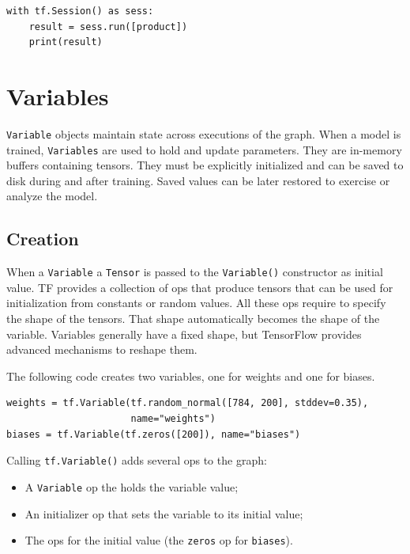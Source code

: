\begin{lstlisting}
with tf.Session() as sess:
    result = sess.run([product])
    print(result)
\end{lstlisting}

\section{Variables}

\lstinline|Variable| objects maintain state across executions of the graph. When a model is trained, \lstinline|Variables| are used to hold and update parameters. They are in-memory buffers containing tensors. They must be explicitly initialized and can be saved to disk during and after training. Saved values can be later restored to exercise or analyze the model.

\subsection{Creation}

When a \lstinline|Variable| a \lstinline|Tensor| is passed to the \lstinline|Variable()| constructor as initial value. \acs{TF} provides a collection of ops that produce tensors that can be used for initialization from constants or random values. All these ops require to specify the shape of the tensors. That shape automatically becomes the shape of the variable. Variables generally have a fixed shape, but TensorFlow provides advanced mechanisms to reshape them.

The following code creates two variables, one for weights and one for biases.

\begin{lstlisting}
weights = tf.Variable(tf.random_normal([784, 200], stddev=0.35),
                      name="weights")
biases = tf.Variable(tf.zeros([200]), name="biases")
\end{lstlisting}

Calling \lstinline|tf.Variable()| adds several ops to the graph:

\begin{itemize}
	\item A \lstinline|Variable| op the holds the variable value;
	\item An initializer op that sets the variable to its initial value;
	\item The ops for the initial value (\eg the \lstinline|zeros| op for \lstinline|biases|).
\end{itemize}

